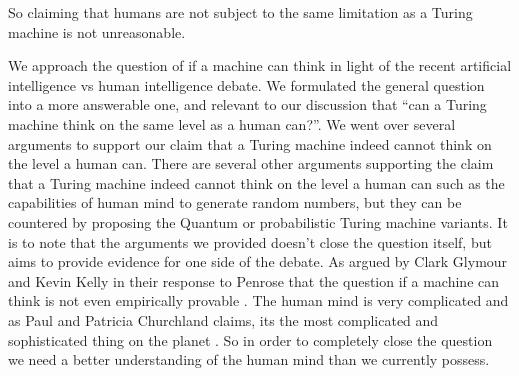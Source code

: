 \documentclass[11pt,a4paper]{article}
\begin{document}
So claiming that humans are not subject to the same limitation as a Turing machine is not unreasonable.
\\\par\vspace*{0.5cm}
We approach the question of if a machine can think in light of the recent artificial intelligence vs human intelligence debate. 
We formulated the general question into a more answerable one, and relevant to our discussion that ``can a Turing machine think on the same level as a human can?''.
We went over several arguments to support our claim that a Turing machine indeed cannot think on the level a human can. There are several other arguments supporting the claim that a Turing machine indeed cannot think on the level a human can such as the capabilities of human mind to generate random numbers, but they can be countered by proposing the Quantum or probabilistic Turing machine variants.
It is to note that the arguments we provided doesn't close the question itself, but aims to provide evidence for one side of the debate.
As argued by Clark Glymour and Kevin Kelly in their response to Penrose that the question if a machine can think is not even empirically provable \cite{glymour_kelly_1990}. The human mind is very complicated and as Paul and Patricia Churchland claims, its the most complicated and sophisticated thing on the planet \cite{Churchland}.
So in order to completely close the question we need a better understanding of the human mind than we currently possess.

 
 
\end{document}
